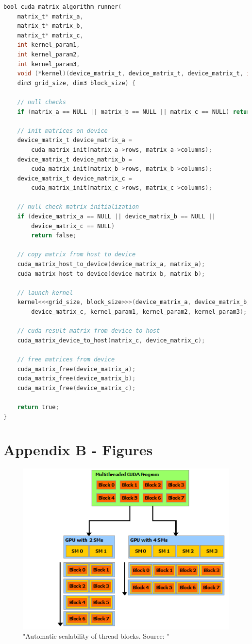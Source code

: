 \begin{lstlisting}[language=C, caption={Algorithm runner for GPU algorithms.}, label={lst:algorithm_runner}]
bool cuda_matrix_algorithm_runner(
    matrix_t* matrix_a, 
    matrix_t* matrix_b,
    matrix_t* matrix_c, 
    int kernel_param1, 
    int kernel_param2, 
    int kernel_param3,
    void (*kernel)(device_matrix_t, device_matrix_t, device_matrix_t, int, int, int),
    dim3 grid_size, dim3 block_size) {
    
    // null checks
    if (matrix_a == NULL || matrix_b == NULL || matrix_c == NULL) return false;

    // init matrices on device
    device_matrix_t device_matrix_a =
        cuda_matrix_init(matrix_a->rows, matrix_a->columns);
    device_matrix_t device_matrix_b =
        cuda_matrix_init(matrix_b->rows, matrix_b->columns);
    device_matrix_t device_matrix_c =
        cuda_matrix_init(matrix_c->rows, matrix_c->columns);

    // null check matrix initialization
    if (device_matrix_a == NULL || device_matrix_b == NULL ||
        device_matrix_c == NULL)
        return false;

    // copy matrix from host to device
    cuda_matrix_host_to_device(device_matrix_a, matrix_a);
    cuda_matrix_host_to_device(device_matrix_b, matrix_b);

    // launch kernel
    kernel<<<grid_size, block_size>>>(device_matrix_a, device_matrix_b,
        device_matrix_c, kernel_param1, kernel_param2, kernel_param3);

    // cuda result matrix from device to host
    cuda_matrix_device_to_host(matrix_c, device_matrix_c);

    // free matrices from device
    cuda_matrix_free(device_matrix_a);
    cuda_matrix_free(device_matrix_b);
    cuda_matrix_free(device_matrix_c);

    return true;
}
\end{lstlisting}

\newpage
\section*{Appendix B - Figures}

\begin{figure}[ht]
\includegraphics[width=\textwidth]{Documents/Report/Figures/Automatic scalability.png}
\caption{"Automatic scalability of thread blocks. Source: \cite[Figure 3]{nvidia:cudadoc}"}
\label{fig:automatic scalability}
\end{figure}

